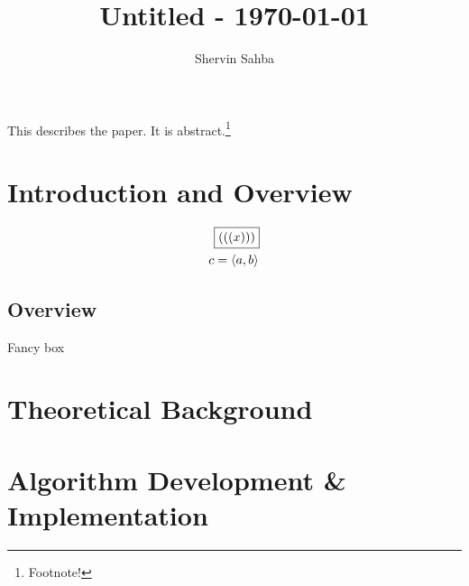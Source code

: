 \documentclass{shervin} %
\begin{document}
\title{Untitled - \today}

\author{Shervin Sahba\authormark{}}
\address{\authormark{}Department of Physics, University of Washington, Seattle, USA.}

\begin{abstract*}
This describes the paper. It is abstract.\footnote{Footnote!}
\end{abstract*}


\section{Introduction and Overview} \label{sec: Introduction}

\begin{tcolorbox}[title=Cool Box, fonttitle=\bfseries, titlebox=visible, sidebyside, enhanced, frame style={left color=red!75!black,right color=blue!75!black}]
\begin{align}
&\boxed{(((x)))} \\
c&= \langle a, b \rangle
\end{align}

\tcblower
\lipsum[1]
\end{tcolorbox}


\subsection{Overview} \label{sec: Overview}

\begin{mybox}{Fancy box}
\lipsum[2]
\end{mybox}

\bigskip
\section{Theoretical Background} \label{sec:Background}

\bigskip
\section{Algorithm Development \& Implementation} \label{sec:Methods}
\end{document}
